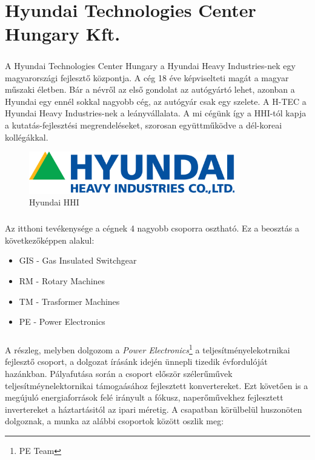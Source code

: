 \chapter*{Hyundai Technologies Center Hungary Kft.}

\paragraph{}
A Hyundai Technologies Center Hungary a Hyundai Heavy Industries-nek egy magyarországi fejlesztő központja. A cég 18 éve képviselteti magát a magyar műszaki életben. Bár a névről az első gondolat az autógyártó lehet, azonban a Hyundai egy ennél sokkal nagyobb cég, az autógyár csak egy szelete. A H-TEC a Hyundai Heavy Industries-nek a leányvállalata. A mi cégünk így a HHI-tól kapja a kutatás-fejlesztési megrendeléseket, szorosan együttműködve a dél-koreai kollégákkal.

\begin{figure}[h]
	\centering
	\includegraphics[width = 0.8\textwidth]{figures/hyundai_logo.png}
	\caption{Hyundai HHI} 
	\label{fig:hhi}
\end{figure}

\paragraph{}
Az itthoni tevékenysége a cégnek 4 nagyobb csoporra osztható. Ez a beosztás a következőképpen alakul:


\begin{itemize}
	\item{GIS - Gas Insulated Switchgear}
	\item{RM - Rotary Machines}
	\item{TM - Trasformer Machines}
	\item{PE - Power Electronics}
\end{itemize}


\paragraph{}
A részleg, melyben dolgozom a \emph{Power Electronics}\footnote{PE Team} a teljesítményelekotrnikai fejlesztő csoport, a dolgozat írásánk idején ünnepli tizedik évfordulóját hazánkban. Pályafutása során a csoport először szélerűművek teljesítméynelektornikai támogaásához fejlesztett konvertereket. Ezt követően is a megújuló energiaforrások felé irányult a fókusz, naperőművekhez fejlesztett invertereket a háztartásitól az ipari méretig. A csapatban körülbelül huszonöten dolgoznak, a munka az alábbi csoportok között oszlik meg:

